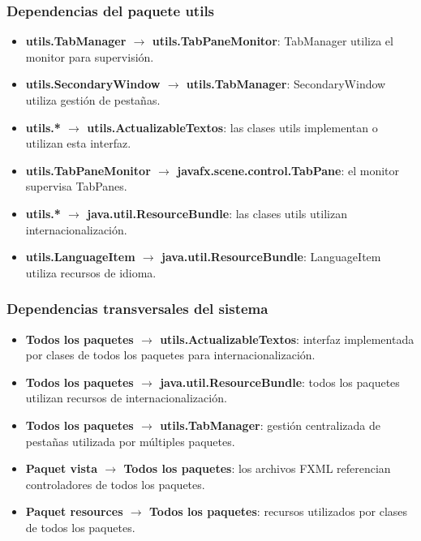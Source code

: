 \subsubsection{Dependencias del paquete utils}

\begin{itemize}
    \item \textbf{utils.TabManager $\rightarrow$ utils.TabPaneMonitor}: TabManager utiliza el monitor para supervisión.
    \item \textbf{utils.SecondaryWindow $\rightarrow$ utils.TabManager}: SecondaryWindow utiliza gestión de pestañas.
    \item \textbf{utils.* $\rightarrow$ utils.ActualizableTextos}: las clases utils implementan o utilizan esta interfaz.
    \item \textbf{utils.TabPaneMonitor $\rightarrow$ javafx.scene.control.TabPane}: el monitor supervisa TabPanes.
    \item \textbf{utils.* $\rightarrow$ java.util.ResourceBundle}: las clases utils utilizan internacionalización.
    \item \textbf{utils.LanguageItem $\rightarrow$ java.util.ResourceBundle}: LanguageItem utiliza recursos de idioma.
\end{itemize}

\subsubsection{Dependencias transversales del sistema}

\begin{itemize}
    \item \textbf{Todos los paquetes $\rightarrow$ utils.ActualizableTextos}: interfaz implementada por clases de todos los paquetes para internacionalización.
    \item \textbf{Todos los paquetes $\rightarrow$ java.util.ResourceBundle}: todos los paquetes utilizan recursos de internacionalización.
    \item \textbf{Todos los paquetes $\rightarrow$ utils.TabManager}: gestión centralizada de pestañas utilizada por múltiples paquetes.
    \item \textbf{Paquet vista $\rightarrow$ Todos los paquetes}: los archivos FXML referencian controladores de todos los paquetes.
    \item \textbf{Paquet resources $\rightarrow$ Todos los paquetes}: recursos utilizados por clases de todos los paquetes.
\end{itemize}

